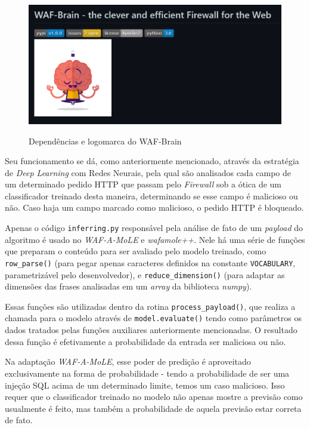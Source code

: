 \begin{figure}[ht]
    \centering
    \caption{Dependências e logomarca do WAF-Brain}
    \includegraphics[width=12.5cm]{figuras/WAFBrain.png} 
    \label{fig:internet} 
\end{figure}

Seu funcionamento se dá, como anteriormente mencionado, através da estratégia de \textit{Deep Learning} com Redes Neurais, pela qual são analisados cada campo de um determinado pedido HTTP que passam pelo \textit{Firewall} sob a ótica de um classificador treinado desta maneira, determinando se esse campo é malicioso ou não. Caso haja um campo marcado como malicioso, o pedido HTTP é bloqueado.

Apenas o código \verb+inferring.py+ responsável pela análise de fato de um \textit{payload} do algoritmo é usado no \textit{WAF-A-MoLE} e \textit{wafamole++}. Nele há uma série de funções que preparam o conteúdo para ser avaliado pelo modelo treinado, como \verb+row_parse()+ (para pegar apenas caracteres definidos na constante \verb+VOCABULARY+, parametrizável pelo desenvolvedor), e \verb+reduce_dimension()+ (para adaptar as dimensões das frases analisadas em um \textit{array} da biblioteca \textit{numpy}).

Essas funções são utilizadas dentro da rotina \verb+process_payload()+, que realiza a chamada para o modelo através de \verb+model.evaluate()+ tendo como parâmetros os dados tratados pelas funções auxiliares anteriormente mencionadas. O resultado dessa função é efetivamente a probabilidade da entrada ser maliciosa ou não.

Na adaptação \textit{WAF-A-MoLE}, esse poder de predição é aproveitado exclusivamente na forma de probabilidade - tendo a probabilidade de ser uma injeção SQL acima de um determinado limite, temos um caso malicioso. Isso requer que o classificador treinado no modelo não apenas mostre a previsão como usualmente é feito, mas também a probabilidade de aquela previsão estar correta de fato.

